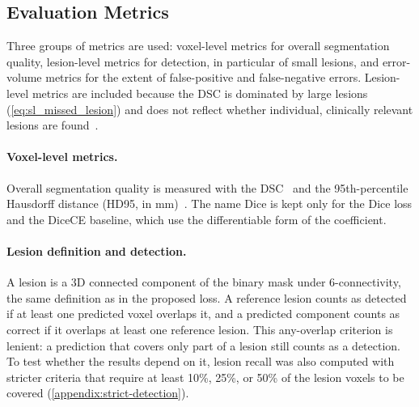 \subsection{Evaluation Metrics}

Three groups of metrics are used: voxel-level metrics for overall
segmentation quality, lesion-level metrics for detection, in particular of
small lesions, and error-volume metrics for the extent of false-positive
and false-negative errors. Lesion-level metrics are included because the
DSC is dominated by large lesions (\cref{eq:sl_missed_lesion}) and does not
reflect whether individual, clinically relevant lesions are
found~\cite{basit_rethinking_2026,jaus_every_2025}.

\paragraph{Voxel-level metrics.}
Overall segmentation quality is measured with the DSC~\cite{dice_measures_1945}
and the 95th-percentile Hausdorff distance (HD95, in
mm)~\cite{taha_metrics_2015}. The name Dice is kept only for the Dice loss
and the DiceCE baseline, which use the differentiable form of the
coefficient.

\paragraph{Lesion definition and detection.}
A lesion is a 3D connected component of the binary mask under
6-connectivity, the same definition as in the proposed loss. A reference
lesion counts as detected if at least one predicted voxel overlaps it, and
a predicted component counts as correct if it overlaps at least one
reference lesion. This any-overlap criterion is lenient: a prediction that
covers only part of a lesion still counts as a detection. To test whether
the results depend on it, lesion recall was also computed with stricter
criteria that require at least 10\%, 25\%, or 50\% of the lesion voxels to
be covered (\cref{appendix:strict-detection}).

